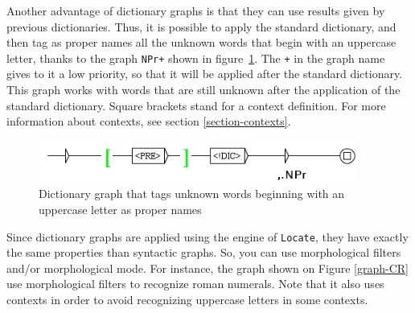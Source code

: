 \bigskip
\noindent Another advantage of dictionary graphs is that they can use results
given by previous dictionaries. Thus, it is possible to apply the standard dictionary, and then tag as proper
names all the unknown words that begin with an uppercase letter, thanks to the
graph \verb$NPr+$ shown in figure~\ref{graph-NPr}. The \verb$+$ in the graph
name gives to it a low priority, so that it will be applied after the standard
dictionary. This graph works with words that are still unknown after the
application of the standard dictionary. Square brackets stand for a context definition.
For more information about contexts, see section
\ref{section-contexts}.

\begin{figure}[!h]
\begin{center}
\includegraphics[width=10.5cm]{resources/img/fig3-13.png}
\caption{Dictionary graph that tags unknown words beginning with an uppercase letter as proper names\label{graph-NPr}}
\end{center}
\end{figure}

\bigskip
\noindent Since dictionary graphs are applied using the engine of \verb+Locate+,
they have exactly the same properties than syntactic graphs. So,
you can use morphological filters and/or morphological mode.
For instance, the
graph shown on Figure \ref{graph-CR} use morphological filters to recognize
roman numerals. Note that it also uses contexts in order to avoid recognizing 
uppercase letters in some contexts.


